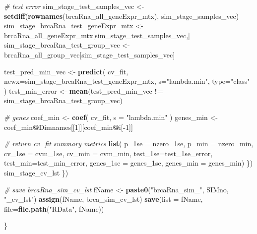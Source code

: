 \documentclass[
]{book}
\newenvironment{Shaded}{\begin{snugshade}}{\end{snugshade}}
\newcommand{\CommentTok}[1]{\textcolor[rgb]{0.56,0.35,0.01}{\textit{#1}}}
\newcommand{\DataTypeTok}[1]{\textcolor[rgb]{0.13,0.29,0.53}{#1}}
\newcommand{\DecValTok}[1]{\textcolor[rgb]{0.00,0.00,0.81}{#1}}
\newcommand{\KeywordTok}[1]{\textcolor[rgb]{0.13,0.29,0.53}{\textbf{#1}}}
\newcommand{\NormalTok}[1]{#1}
\newcommand{\OperatorTok}[1]{\textcolor[rgb]{0.81,0.36,0.00}{\textbf{#1}}}
\newcommand{\StringTok}[1]{\textcolor[rgb]{0.31,0.60,0.02}{#1}}
\begin{document}
\begin{Shaded}
\begin{Highlighting}[]
      \CommentTok{\# test error}
\NormalTok{      sim\_stage\_test\_samples\_vec <{-}}\StringTok{ }\KeywordTok{setdiff}\NormalTok{(}\KeywordTok{rownames}\NormalTok{(brcaRna\_all\_geneExpr\_mtx), sim\_stage\_samples\_vec)}
\NormalTok{      sim\_stage\_brcaRna\_test\_geneExpr\_mtx <{-}}\StringTok{ }\NormalTok{brcaRna\_all\_geneExpr\_mtx[sim\_stage\_test\_samples\_vec,]}
\NormalTok{      sim\_stage\_brcaRna\_test\_group\_vec <{-}}\StringTok{ }\NormalTok{brcaRna\_all\_group\_vec[sim\_stage\_test\_samples\_vec]}

\NormalTok{      test\_pred\_min\_vec <{-}}\StringTok{ }\KeywordTok{predict}\NormalTok{(}
\NormalTok{       cv\_fit,}
       \DataTypeTok{newx=}\NormalTok{sim\_stage\_brcaRna\_test\_geneExpr\_mtx,}
       \DataTypeTok{s=}\StringTok{"lambda.min"}\NormalTok{,}
       \DataTypeTok{type=}\StringTok{"class"}
\NormalTok{      )}
\NormalTok{      test\_min\_error <{-}}\StringTok{ }\KeywordTok{mean}\NormalTok{(test\_pred\_min\_vec }\OperatorTok{!=}\StringTok{ }\NormalTok{sim\_stage\_brcaRna\_test\_group\_vec)}

      \CommentTok{\# genes}
\NormalTok{      coef\_min <{-}}\StringTok{ }\KeywordTok{coef}\NormalTok{(}
\NormalTok{        cv\_fit,}
        \DataTypeTok{s =} \StringTok{"lambda.min"}
\NormalTok{      )}
\NormalTok{      genes\_min <{-}}\StringTok{ }\NormalTok{coef\_min}\OperatorTok{@}\NormalTok{Dimnames[[}\DecValTok{1}\NormalTok{]][coef\_min}\OperatorTok{@}\NormalTok{i[}\OperatorTok{{-}}\DecValTok{1}\NormalTok{]]}

      \CommentTok{\# return cv\_fit summary metrics}
      \KeywordTok{list}\NormalTok{(}
       \DataTypeTok{p\_1se =}\NormalTok{ nzero\_1se, }
       \DataTypeTok{p\_min =}\NormalTok{ nzero\_min, }
       \DataTypeTok{cv\_1se =}\NormalTok{ cvm\_1se, }
       \DataTypeTok{cv\_min =}\NormalTok{ cvm\_min, }
       \DataTypeTok{test\_1se=}\NormalTok{test\_1se\_error, }
       \DataTypeTok{test\_min=}\NormalTok{test\_min\_error, }
       \DataTypeTok{genes\_1se =}\NormalTok{ genes\_1se,}
       \DataTypeTok{genes\_min =}\NormalTok{ genes\_min)}
\NormalTok{    \})}
\NormalTok{    sim\_stage\_cv\_lst}
\NormalTok{  \})}

  \CommentTok{\# save  brcaRna\_sim\_cv\_lst}
\NormalTok{  fName <{-}}\StringTok{ }\KeywordTok{paste0}\NormalTok{(}\StringTok{"brcaRna\_sim\_"}\NormalTok{, SIMno, }\StringTok{"\_cv\_lst"}\NormalTok{)}
  \KeywordTok{assign}\NormalTok{(fName, brca\_sim\_cv\_lst)}
  \KeywordTok{save}\NormalTok{(}\DataTypeTok{list =}\NormalTok{ fName, }\DataTypeTok{file=}\KeywordTok{file.path}\NormalTok{(}\StringTok{"RData"}\NormalTok{, fName))}

\NormalTok{\}}
\end{Highlighting}
\end{Shaded}
\end{document}
